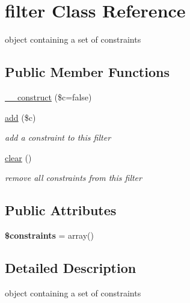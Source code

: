\hypertarget{classfilter}{\section{filter Class Reference}
\label{classfilter}
}


object containing a set of constraints  


\subsection*{Public Member Functions}
\begin{DoxyCompactItemize}
\item 
\hyperlink{classfilter_a4450fa4f5c5650cc2f9977cfe3e46f07}{\-\_\-\-\_\-construct} (\$c=false)
\item 
\hyperlink{classfilter_ab8a6f36222725436d225a0494867147c}{add} (\$c)
\begin{DoxyCompactList}\small\item\em add a constraint to this filter \end{DoxyCompactList}\item 
\hypertarget{classfilter_a439738ea679da2927ae93629c8fa0f35}{\hyperlink{classfilter_a439738ea679da2927ae93629c8fa0f35}{clear} ()}\label{classfilter_a439738ea679da2927ae93629c8fa0f35}

\begin{DoxyCompactList}\small\item\em remove all constraints from this filter \end{DoxyCompactList}\end{DoxyCompactItemize}
\subsection*{Public Attributes}
\begin{DoxyCompactItemize}
\item 
\hypertarget{classfilter_aec248d073939e1934ee24de4fd4ec6fd}{{\bfseries \$constraints} = array()}\label{classfilter_aec248d073939e1934ee24de4fd4ec6fd}

\end{DoxyCompactItemize}


\subsection{Detailed Description}
object containing a set of constraints 

